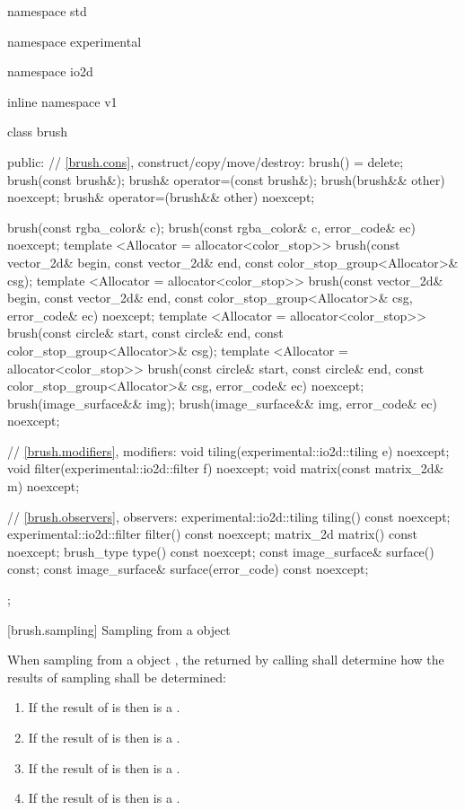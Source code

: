 \begin{codeblock}
namespace std { namespace experimental { namespace io2d { inline namespace v1 {
  class brush {
  public:
    // \ref{brush.cons}, construct/copy/move/destroy:
    brush() = delete;
    brush(const brush&);
    brush& operator=(const brush&);
    brush(brush&& other) noexcept;
    brush& operator=(brush&& other) noexcept;
    
    brush(const rgba_color& c);
    brush(const rgba_color& c, error_code& ec) noexcept;
    template <Allocator = allocator<color_stop>>
    brush(const vector_2d& begin, const vector_2d& end,
      const color_stop_group<Allocator>& csg);
    template <Allocator = allocator<color_stop>>
    brush(const vector_2d& begin, const vector_2d& end,
      const color_stop_group<Allocator>& csg, error_code& ec) noexcept;
    template <Allocator = allocator<color_stop>>
    brush(const circle& start, const circle& end,
      const color_stop_group<Allocator>& csg);
    template <Allocator = allocator<color_stop>>
    brush(const circle& start, const circle& end,
      const color_stop_group<Allocator>& csg, error_code& ec) noexcept;
    brush(image_surface&& img);
    brush(image_surface&& img, error_code& ec) noexcept;

    // \ref{brush.modifiers}, modifiers:
    void tiling(experimental::io2d::tiling e) noexcept;
    void filter(experimental::io2d::filter f) noexcept;
    void matrix(const matrix_2d& m) noexcept;

    // \ref{brush.observers}, observers:
    experimental::io2d::tiling tiling() const noexcept;
    experimental::io2d::filter filter() const noexcept;
    matrix_2d matrix() const noexcept;
    brush_type type() const noexcept;
    const image_surface& surface() const;
    const image_surface& surface(error_code) const noexcept;
  };
} } } }
\end{codeblock}

 [brush.sampling] {Sampling from a  object}

\pnum
When sampling from a  object , the  returned by calling  shall determine how the results of sampling shall be determined:
\begin{enumerate}
\item If the result of  is  then  is a .
\item If the result of  is  then  is a .
\item If the result of  is  then  is a .
\item If the result of  is  then  is a .
\end{enumerate}

